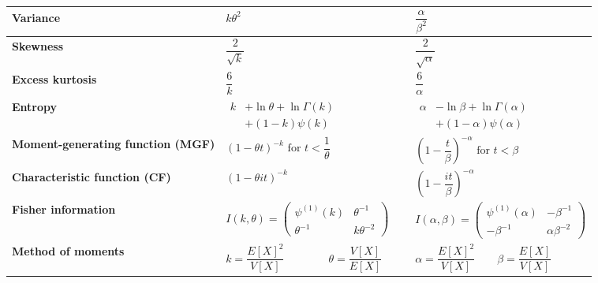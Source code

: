 \begin{customTableWrapper}{2}
\begin{longtable}{|m{3cm}|p{5.5cm}|p{5.5cm}|}
    \textbf{Variance} &
    ${ k\theta ^{2}}$ &
    ${ {\dfrac {\alpha }{\beta ^{2}}}}$
    \\[1ex] \hline

    \textbf{Skewness} &
    ${ {\dfrac {2}{\sqrt {k}}}}$&
    ${ {\dfrac {2}{\sqrt {\alpha }}}}$
    \\[1ex] \hline

    \textbf{Excess kurtosis} &
    ${ {\dfrac {6}{k}}}$&
    ${ {\dfrac {6}{\alpha }}}$
    \\[1ex] \hline

    \textbf{Entropy} &
    ${ {\begin{aligned}k&+\ln \theta +\ln \Gamma (k)\\&+(1-k)\psi (k)\end{aligned}}}$&
    ${ {\begin{aligned}\alpha &-\ln \beta +\ln \Gamma (\alpha )\\&+(1-\alpha )\psi (\alpha )\end{aligned}}}$
    \\[1ex] \hline

    \textbf{Moment-generating function (MGF)} &
    ${ (1-\theta t)^{-k}{\text{ for }}t<{\dfrac {1}{\theta }}}$&
    ${ \left(1-{\dfrac {t}{\beta }}\right)^{-\alpha }{\text{ for }}t<\beta }$
    \\[1ex] \hline

    \textbf{Characteristic function (CF)} &
    ${ (1-\theta it)^{-k}}$&
    ${ \left(1-{\dfrac {it}{\beta }}\right)^{-\alpha }}$
    \\[1ex] \hline

    \textbf{Fisher information} &
    ${ I(k,\theta )={\begin{pmatrix}\psi ^{(1)}(k)&\theta ^{-1}\\\theta ^{-1}&k\theta ^{-2}\end{pmatrix}}}$&
    ${ I(\alpha ,\beta )={\begin{pmatrix}\psi ^{(1)}(\alpha )&-\beta ^{-1}\\-\beta ^{-1}&\alpha \beta ^{-2}\end{pmatrix}}}$
    \\[1ex] \hline

    \textbf{Method of moments} &
    $
        { k={\dfrac {E[X]^{2}}{V[X]}}\quad \quad }
        \quad\quad
        { \theta ={\dfrac {V[X]}{E[X]}}\quad \quad }
    $&
    $
        { \alpha ={\dfrac {E[X]^{2}}{V[X]}}}
        \quad\quad
        { \beta ={\dfrac {E[X]}{V[X]}}}
    $
    \\[1ex] \hline

\end{longtable}
\end{customTableWrapper}

